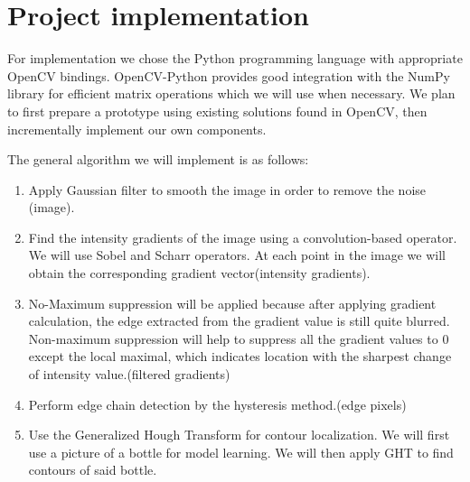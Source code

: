 \documentclass[letterpaper,12pt]{article}
\begin{document}
\section{Project implementation}

For implementation we chose the Python programming language with appropriate OpenCV bindings. OpenCV-Python provides good integration with the NumPy library for efficient matrix operations which we will use when necessary.
We plan to first prepare a prototype using existing solutions found in OpenCV, then incrementally implement our own components.


The general algorithm we will implement is as follows:
\begin{enumerate}
	\item Apply Gaussian filter to smooth the image in order to remove the noise (image).
    \item Find the intensity gradients of the image using a convolution-based operator. We will use Sobel and Scharr operators. At each point in the image we will obtain the corresponding gradient vector(intensity gradients).

    \item No-Maximum suppression will be applied because after applying gradient calculation, the edge extracted from the gradient value is still quite blurred. Non-maximum suppression will help to suppress all the gradient values to 0 except the local maximal, which indicates location with the sharpest change of intensity value.(filtered gradients)

    \item Perform edge chain detection by the hysteresis method.(edge pixels) 

    \item Use the Generalized Hough Transform for contour localization. We will first use a picture of a bottle for model learning. We will then apply GHT to find contours of said bottle.
\end{enumerate}


%
%
%
%
\end{document}

